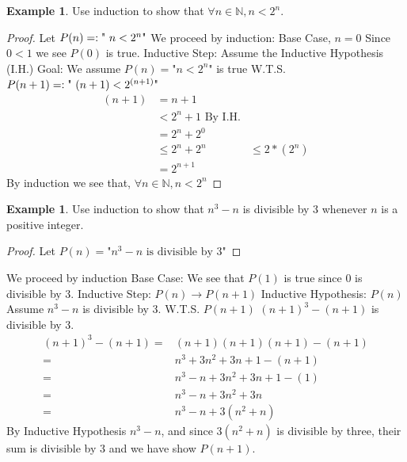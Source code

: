 \documentclass[letterpaper,10pt]{article}
\theoremstyle{plain}
\theoremstyle{definition}
\newtheorem{exmp}[thm]{Example}
\theoremstyle{remark}
\begin{document}
\begin{exmp}
Use induction to show that $\forall n\in \mathbb{N}, n< 2^n$.
\begin{proof}
Let $P(n)=:\text{" $ n< 2^n$"}$
\newline
We proceed by induction:
\newline
Base Case, $n=0$
\newline
Since $0<1$ we see $P(0)$ is true. 
\newline
Inductive Step:
\newline
Assume the Inductive Hypothesis (I.H.)
\newline
Goal:
\newline
We assume $P(n)=\text{"$n<2^n$"}$ is true
\newline
W.T.S. $P(n+1)=:\text{" $ (n+1)< 2^{(n+1)}$"}$
\newline
\begin{align}
(n+1)&=n+1\\
    &<2^n+1 \text{ By I.H.}\\
    &=2^n+2^0\\
    &\leq 2^n+2^n
    &\leq 2*(2^n)\\
    &=2^{n+1}
\end{align}
By induction we see that,
$\forall n \in \mathbb{N}, n<2^n$

\end{proof}

\end{exmp}
\begin{exmp}
Use induction to show that $n^3-n$ is divisible by 3 whenever $n$ is a positive integer. 
\begin{proof}
Let $P(n)=\text{"$n^3-n$ is divisible by 3"}$
\newline

\end{proof}
We proceed by induction
\newline
Base Case:
\newline
We see that $P(1)$ is true since 0 is divisible by 3.
\newline
Inductive Step: $P(n)\to P(n+1)$
\newline
Inductive Hypothesis: $P(n)$
\newline
Assume $n^3-n$ is divisible by 3.
\newline
W.T.S. $P(n+1)$
\newline
$(n+1)^3-(n+1)$ is divisible by 3.
\newline
\begin{align}
(n+1)^3-(n+1)=&(n+1)(n+1)(n+1)-(n+1)\\
=&n^3+3n^2+3n+1-(n+1)\\
=&n^3-n +3n^2+3n+1-(1)\\
=&n^3-n +3n^2+3n\\
=&n^3-n +3(n^2+n)
\end{align}
By Inductive Hypothesis $n^3-n$, and since $3(n^2+n)$ is divisible by three, their sum is divisible by 3 and we have show $P(n+1)$.
\end{exmp}
\newpage
\end{document}
